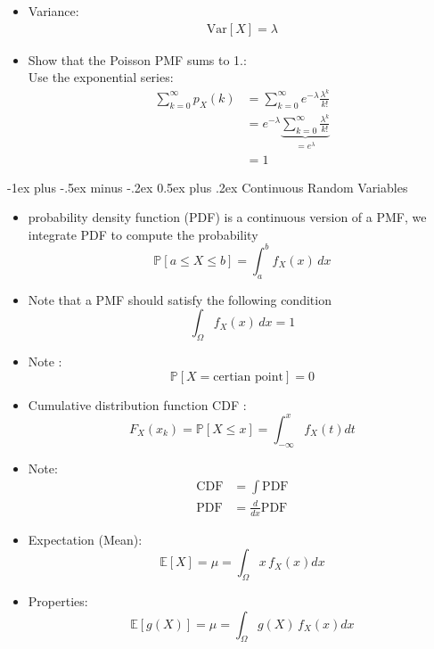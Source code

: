 \documentclass[a4paper]{article}
\makeatletter
\newcommand*\pp{\mathbb{P}}
\renewcommand{\section}{\@startsection{section}{1}{0mm}%
                                {-1ex plus -.5ex minus -.2ex}%
                                {0.5ex plus .2ex}%
                                {\normalfont\large\bfseries}}
\makeatother
\begin{document}
\begin{multicols}{3}
\begin{itemize}
\item Variance:
\begin{align*}
\text{Var}[X] = \lambda 
\end{align*}

\item Show that the Poisson PMF sums to 1.:\\
Use the exponential series:
\begin{align*}
\sum_{k=0}^\infty p_X(k) &= \sum_{k=0}^\infty e^{-\lambda} \frac{\lambda^k}{k!}\\ &= e^{-\lambda} \underbrace{\sum_{k=0}^\infty \frac{\lambda^k}{k!}}_{=e^{\lambda}}\\ &=1 
\end{align*}

\end{itemize}

\section{Continuous Random Variables}
\begin{itemize}

\item  probability density function (PDF) is a continuous version of a PMF, we integrate PDF to compute the probability
$$ \pp[a\leq X \leq b] = \int_a^b f_X(x) \, dx $$



\item Note that a PMF should satisfy the following condition 
$$\int_{\Omega} f_X(x)\, dx = 1 $$

\item Note : 
$$\pp[X=\text{certian point} ] = 0 $$

\item Cumulative distribution function CDF  :
$$ F_X(x_k) = \pp[X \leq x] = \int_{-\infty}^x f_X(t) dt $$

\item Note:
\begin{align*}
\text{CDF} &= \int \text{PDF}\\
\text{PDF} &= \frac{d}{dx} \text{PDF}
\end{align*}


\item Expectation (Mean):
$$ \mathbb{E}[X] = \mu =\int_{\Omega} x\,f_X(x) dx  $$

\item Properties:
$$ \mathbb{E}[g(X)] = \mu =\int_{\Omega} g(X)\,f_X(x) dx  $$



\end{itemize}
\end{multicols}
\end{document}
